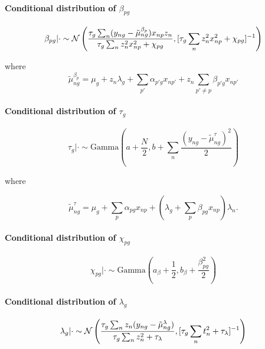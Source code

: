\paragraph{Conditional distribution of $\beta_{pg}$}

\begin{equation}
\beta_{pg} | \cdot \sim \mathcal{N} \left( \frac{
\tau_g \sum_n (y_{ng} - \tilde{\mu}_{ng}^{\beta_p})x_{np} z_n
}{\tau_g \sum_n z_n^2 x_{np}^2 + \chi_{pg}},
[\tau_g \sum_n z_n^2 x_{np}^2 + \chi_{pg}]^{-1} \right)
\end{equation}

where
\begin{equation}
\tilde{\mu}_{ng}^{\beta_p} = \mu_g + z_n \lambda_g  +
\sum_{p'} \alpha_{p'g} x_{np'} + z_n \sum_{p' \neq p} \beta_{p'g} x_{np'}
\end{equation}

\paragraph{Conditional distribution of $\tau_g$}

\begin{equation}
\tau_g | \cdot \sim \text{Gamma}\left(
a + \frac{N}{2}, b + \sum_n \frac{(y_{ng} - \tilde{\mu}^\tau_{ng})^2}{2}
\right)
\end{equation}

where

\begin{equation}
\tilde{\mu}^\tau_{ng} = \mu_g + \sum_p \alpha_{pg} x_{np} + \left( \lambda_g + \sum_p \beta_{pg} x_{np} \right) \lambda_n.
\end{equation}

\paragraph{Conditional distribution of $\chi_{pg}$}

\begin{equation}
\chi_{pg} | \cdot \sim \text{Gamma}\left( a_\beta + \frac{1}{2}, b_\beta + \frac{\beta_{pg}^2}{2}\right)
\end{equation}

\paragraph{Conditional distribution of $\lambda_g$}

\begin{equation}
\lambda_g | \cdot \sim \mathcal{N}\left(
\frac{\tau_g \sum_n z_n(y_{ng} - \tilde{\mu}^\lambda_{ng})}{\tau_g \sum_n z_n^2 + \tau_\lambda},
[\tau_g \sum_n t_n^2 + \tau_\lambda]^{-1}
\right)
\end{equation}

